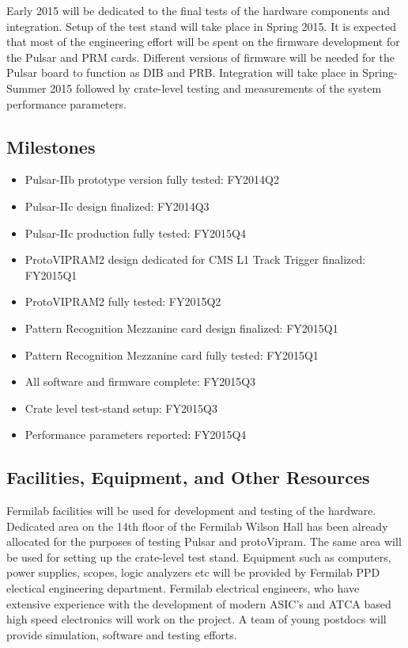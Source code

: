 Early 2015 will be dedicated to the final tests of the hardware components and integration. Setup of the  test stand will take place in Spring 2015.  It is expected that most of the engineering effort will be spent on the firmware development for the Pulsar and  PRM cards. Different versions of firmware will be needed for the Pulsar board to function as DIB and PRB. Integration will take place in Spring-Summer 2015 followed by crate-level testing and measurements of the system performance parameters. 

\subsection{Milestones}
\begin{itemize}
\item Pulsar-IIb prototype version fully tested: FY2014Q2
\item Pulsar-IIc design finalized: FY2014Q3
\item Pulsar-IIc production fully tested: FY2015Q4

\item ProtoVIPRAM2 design dedicated for CMS L1 Track Trigger finalized: FY2015Q1
\item ProtoVIPRAM2 fully tested: FY2015Q2

\item Pattern Recognition Mezzanine card design finalized:  FY2015Q1
\item Pattern Recognition Mezzanine card fully tested:  FY2015Q1

\item All software and firmware complete: FY2015Q3
\item Crate level test-stand setup: FY2015Q3
\item Performance parameters reported: FY2015Q4
\end{itemize}

\subsection{Facilities, Equipment, and Other Resources}
Fermilab facilities will be used for development and testing of the hardware.  Dedicated area on the 14th floor of the Fermilab Wilson Hall has been already allocated for the purposes of testing Pulsar and protoVipram. The same area will be used for setting up the crate-level test stand. Equipment such as computers, power supplies, scopes, logic analyzers etc will be provided by Fermilab PPD electical engineering department. Fermilab electrical engineers, who have extensive experience with the development of modern ASIC's and ATCA based high speed electronics will work on the project. A team of young postdocs will provide simulation, software and testing efforts.  

\clearpage